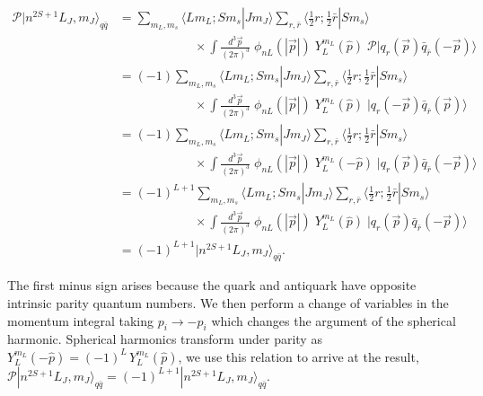 \begin{align*}
\mathcal{P}\Big| n^{2S+1}L_J , m_J \Big\rangle_{q\bar{q}} &=   \sum_{m_L, m_s} \langle L m_L; S m_s | J m_J \rangle \sum_{r,\bar{r}} \langle \tfrac{1}{2}  r; \tfrac{1}{2} \bar{r} | S m_s \rangle \\
 & \qquad \qquad\qquad \times \int  \frac{d^3\vec{p}}{(2\pi)^3}  \;\phi_{nL}( | \vec{p}|) \; Y_{L}^{m_L}(\hat{p}) \; \mathcal{P} \Big|q_{r}(\vec{p}) \bar{q}_{\bar{r}}(-\vec{p}) \Big\rangle  \\
&= (-1) \sum_{m_L, m_s} \langle L m_L; S m_s | J m_J \rangle \sum_{r,\bar{r}} \langle \tfrac{1}{2}  r; \tfrac{1}{2} \bar{r} | S m_s \rangle \\
 & \qquad \qquad\qquad \times \int  \frac{d^3\vec{p}}{(2\pi)^3}  \;\phi_{nL}( | \vec{p}|) \; Y_{L}^{m_L}(\hat{p}) \; \Big|q_{r}(-\vec{p}) \bar{q}_{\bar{r}}(\vec{p}) \Big\rangle \\
 &= (-1) \sum_{m_L, m_s} \langle L m_L; S m_s | J m_J \rangle \sum_{r,\bar{r}} \langle \tfrac{1}{2}  r; \tfrac{1}{2} \bar{r} | S m_s \rangle \\
 & \qquad \qquad\qquad \times \int  \frac{d^3\vec{p}}{(2\pi)^3}  \;\phi_{nL}( | \vec{p}|) \; Y_{L}^{m_L}(-\hat{p}) \; \Big|q_{r}(\vec{p}) \bar{q}_{\bar{r}}(-\vec{p}) \Big\rangle \\
&= (-1)^{L+1} \sum_{m_L, m_s} \langle L m_L; S m_s | J m_J \rangle \sum_{r,\bar{r}} \langle \tfrac{1}{2}  r; \tfrac{1}{2} \bar{r} | S m_s \rangle \\
 & \qquad \qquad\qquad \times \int  \frac{d^3\vec{p}}{(2\pi)^3}  \;\phi_{nL}( | \vec{p}|) \; Y_{L}^{m_L}(\hat{p}) \; \Big|q_{r}(\vec{p}) \bar{q}_{\bar{r}}(-\vec{p}) \Big\rangle \\
&= (-1)^{L+1} \Big| n^{2S+1}L_J , m_J \Big\rangle_{q\bar{q}}.
\end{align*}

The first minus sign arises because the quark and antiquark have opposite intrinsic parity quantum numbers. We then perform a change of variables in the momentum integral taking $p_i \rightarrow -p_i$ which changes the argument of the spherical harmonic. Spherical harmonics transform under parity as $Y_{L}^{m_L}(-\hat{p}) = (-1)^L \,Y_{L}^{m_L}(\hat{p})$, we use this relation to arrive at the result,  $\mathcal{P} | n^{2S+1}L_J , m_J \rangle_{q\bar{q}}  = (-1)^{L+1} | n^{2S+1}L_J , m_J \rangle_{q\bar{q}}$.

